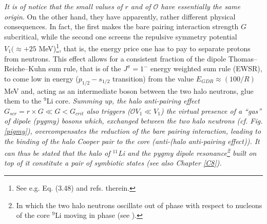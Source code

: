 \textit{It is of notice that the small values of $r$ and of $\mathcal{O}$ have essentially the same origin}. On the other hand, they have apparently, rather different physical consequences. In fact, the first makes the bare pairing interaction strength $G$ subcritical, while the second one screens the repulsive symmetry potential $V_1(\approx +25 $ MeV)\footnote{See e.g. \cite{Bortignon:98} Eq. (3.48) and refs. therein.}, that is, the energy price one has to pay to separate protons from neutrons. This effect allows for a consistent fraction of the dipole Thomas--Reiche--Kuhn sum rule, that is of the $J^{\pi}=1^-$ energy weighted sum rule (EWSR), to come low in energy ($p_{1/2}-s_{1/2}$ transition) from the value $E_{GDR}\approx(100/R)$ MeV and, acting as an intermediate boson between the two halo neutrons, glue them to the $^{9}$Li core. \textit{Summing up, the halo anti-pairing effect $G_{scr}=r\times G\ll G<G_{crit}$ also triggers ($\mathcal{O}V_1\ll V_1$) the virtual presence of a ``gas'' of dipole (pygmy) bosons which, exchanged between the two halo neutrons (cf. Fig. \ref{pigmy}), overcompensates the reduction of the bare pairing interaction, leading to the binding of the halo Cooper 
	 pair to the core (anti-(halo anti-pairing effect)). It can thus be stated that the halo of $^{11}$Li and the pygmy dipole resonance\footnote{In which the two halo neutrons oscillate out of phase with respect to nucleons of the core $^9$Li moving in phase (see \cite{Broglia:19}).} built on top of it constitute a pair of symbiotic states (see also Chapter \ref{C8}).}

